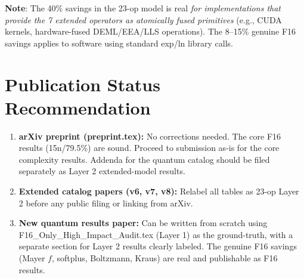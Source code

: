 \documentclass[11pt]{article}
\begin{document}
\textbf{Note}: The 40\% savings in the 23-op model is real \emph{for implementations
that provide the 7 extended operators as atomically fused primitives} (e.g., CUDA kernels,
hardware-fused DEML/EEA/LLS operations). The 8--15\% genuine F16 savings applies to
software using standard exp/ln library calls.

\section{Publication Status Recommendation}

\begin{enumerate}
  \item \textbf{arXiv preprint (preprint.tex):} No corrections needed. The core
    F16 results (15n/79.5\%) are sound. Proceed to submission as-is for the
    core complexity results. Addenda for the quantum catalog should be filed
    separately as Layer 2 extended-model results.

  \item \textbf{Extended catalog papers (v6, v7, v8):} Relabel all tables
    as 23-op Layer 2 before any public filing or linking from arXiv.

  \item \textbf{New quantum results paper:} Can be written from scratch using
    F16\_Only\_High\_Impact\_Audit.tex (Layer 1) as the ground-truth,
    with a separate section for Layer 2 results clearly labeled.
    The genuine F16 savings (Mayer $f$, softplus, Boltzmann, Kraus) are real
    and publishable as F16 results.
\end{enumerate}
\end{document}
